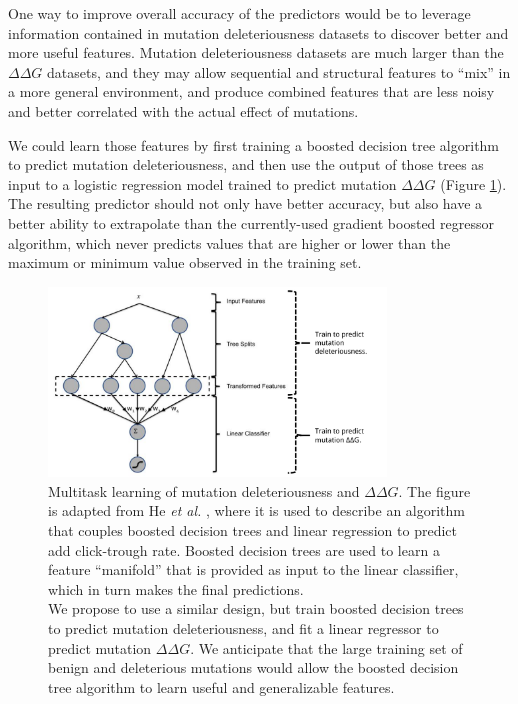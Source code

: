 One way to improve overall accuracy of the predictors would be to leverage information contained in mutation deleteriousness datasets to discover better and more useful features. Mutation deleteriousness datasets are much larger than the $\Delta \Delta G$ datasets, and they may allow sequential and structural features to ``mix'' in a more general environment, and produce combined features that are less noisy and better correlated with the actual effect of mutations.

We could learn those features by first training a boosted decision tree algorithm to predict mutation deleteriousness, and then use the output of those trees as input to a logistic regression model trained to predict mutation $\Delta \Delta G$ (Figure \ref{fig:multitask_learning}). The resulting predictor should not only have better accuracy, but also have a better ability to extrapolate than the currently-used gradient boosted regressor algorithm, which never predicts values that are higher or lower than the maximum or minimum value observed in the training set.

\begin{figure}[tb]
	\centering
	\includegraphics[width=0.8\textwidth]{static/elaspic/multitask_learning.pdf}
	\caption[Multitask learning of mutation deleteriousness and $\Delta \Delta G$.]{
		Multitask learning of mutation deleteriousness and $\Delta \Delta G$.
        The figure is adapted from He \textit{et al.} \cite{he_practical_2014}, where it is used to describe an algorithm that couples boosted decision trees and linear regression to predict add click-trough rate. Boosted decision trees are used to learn a feature ``manifold'' that is provided as input to the linear classifier, which in turn makes the final predictions. \\
        We propose to use a similar design, but train boosted decision trees to predict mutation deleteriousness, and fit a linear regressor to predict mutation $\Delta \Delta G$. We anticipate that the large training set of benign and deleterious mutations would allow the boosted decision tree algorithm to learn useful and generalizable features.
	}
	\label{fig:multitask_learning}
\end{figure}
